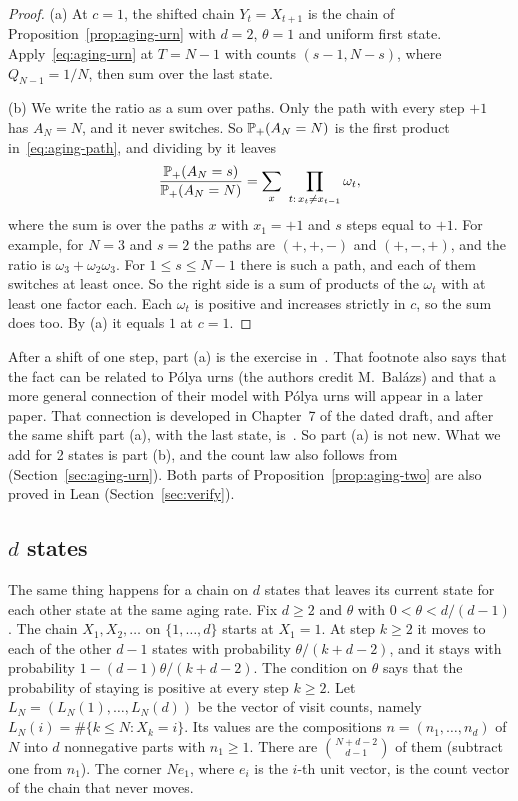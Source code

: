 \begin{proof}
(a) At $c=1$, the shifted chain $Y_t=X_{t+1}$ is the chain of
Proposition~\ref{prop:aging-urn} with $d=2$, $\theta=1$ and uniform first
state. Apply~\eqref{eq:aging-urn} at $T=N-1$ with counts $(s-1,N-s)$,
where $Q_{N-1}=1/N$, then sum over the last state.

(b) We write the ratio as a sum over paths. Only the path with every step
$+1$ has $A_N=N$, and it never switches. So $\mathbb{P}_+(A_N=N)$ is the first
product in~\eqref{eq:aging-path}, and dividing by it leaves
\begin{equation}\label{eq:aging-ratio}
 \frac{\mathbb{P}_+(A_N=s)}{\mathbb{P}_+(A_N=N)}
 =\sum_{x}\ \prod_{t:\,x_t\ne x_{t-1}}\omega_t ,
\end{equation}
where the sum is over the paths $x$ with $x_1=+1$ and $s$ steps equal to
$+1$. For example, for $N=3$ and $s=2$ the paths are $(+,+,-)$ and $(+,-,+)$,
and the ratio is $\omega_3+\omega_2\omega_3$. For $1\le s\le N-1$ there is
such a path, and each of them switches at least once. So the right side is a
sum of products of the $\omega_t$ with at least one factor each. Each
$\omega_t$ is positive and increases strictly in $c$, so the sum does too. By
(a) it equals $1$ at $c=1$.
\end{proof}

After a shift of one step, part (a) is the exercise
in~\cite[Section~3.1, footnote~1]{evw2020}. That footnote also says that the fact
can be related to P\'olya urns (the authors credit M.~Bal\'azs) and that a
more general connection of their model with P\'olya urns will appear in a
later paper.
That connection is developed in Chapter~7 of the dated draft, and after the same
shift part (a), with the last state, is~. So part (a)
is not new. What we add for
2 states is part (b), and the count law also follows
from~\cite[Theorem~2.18]{dls2023} (Section~\ref{sec:aging-urn}). Both parts of
Proposition~\ref{prop:aging-two} are also proved in Lean
(Section~\ref{sec:verify}).

\subsection{\texorpdfstring{$d$}{d} states}

The same thing happens for a chain on $d$ states that leaves its current
state for each other state at the same aging rate. Fix $d\ge2$ and $\theta$
with $0<\theta<d/(d-1)$. The chain $X_1,X_2,\dots$ on $\{1,\dots,d\}$ starts at
$X_1=1$. At step $k\ge2$ it moves to each of the other $d-1$ states with
probability $\theta/(k+d-2)$, and it stays with probability
$1-(d-1)\theta/(k+d-2)$. The condition on $\theta$ says that the probability
of staying is positive at every step $k\ge2$. Let
$L_N=(L_N(1),\dots,L_N(d))$ be the vector of visit counts, namely
$L_N(i)=\#\{k\le N:X_k=i\}$. Its values are the compositions
$n=(n_1,\dots,n_d)$ of $N$ into $d$ nonnegative parts with $n_1\ge1$. There
are $\binom{N+d-2}{d-1}$ of them (subtract one from $n_1$). The corner
$Ne_1$, where $e_i$ is the $i$-th unit vector, is the count vector of the
chain that never moves.

